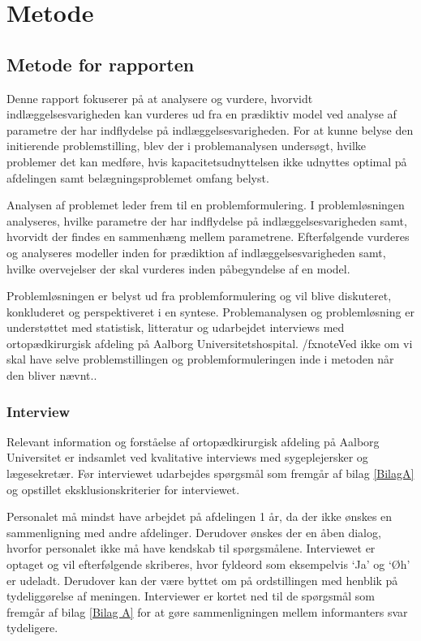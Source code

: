 \chapter*{Metode}
\section*{Metode for rapporten}
Denne rapport fokuserer på at analysere og vurdere, hvorvidt indlæggelsesvarigheden kan vurderes ud fra en prædiktiv model ved analyse af parametre der har indflydelse på indlæggelsesvarigheden. For at kunne belyse den initierende problemstilling, blev der i problemanalysen undersøgt, hvilke problemer det kan medføre, hvis kapacitetsudnyttelsen ikke udnyttes optimal på afdelingen samt belægningsproblemet omfang belyst.


Analysen af problemet leder frem til en problemformulering. I problemløsningen analyseres, hvilke parametre der har indflydelse på indlæggelsesvarigheden samt, hvorvidt der findes en sammenhæng mellem parametrene. Efterfølgende vurderes og analyseres modeller inden for prædiktion af indlæggelsesvarigheden samt, hvilke overvejelser der skal vurderes inden påbegyndelse af en model. 


Problemløsningen er belyst ud fra problemformulering og vil blive diskuteret, konkluderet og perspektiveret i en syntese. Problemanalysen og problemløsning er understøttet med statistisk, litteratur og udarbejdet interviews med ortopædkirurgisk afdeling på Aalborg Universitetshospital.  /fxnote{Ved ikke om vi skal have selve problemstillingen og problemformuleringen inde i metoden når den bliver nævnt.}. 


\subsection*{Interview}
Relevant information og forståelse af ortopædkirurgisk afdeling på Aalborg Universitet er indsamlet ved kvalitative interviews med sygeplejersker og lægesekretær. Før interviewet udarbejdes spørgsmål som fremgår af bilag \ref{BilagA} og opstillet eksklusionskriterier for interviewet. 


Personalet må mindst have arbejdet på afdelingen 1 år, da der ikke ønskes en sammenligning med andre afdelinger. Derudover ønskes der en åben dialog, hvorfor personalet ikke må have kendskab til spørgsmålene. Interviewet er optaget og  vil efterfølgende skriberes, hvor fyldeord som eksempelvis ‘Ja’ og ‘Øh’ er udeladt. Derudover kan der være byttet om på ordstillingen med henblik på tydeliggørelse af meningen. Interviewer er kortet ned til de spørgsmål som fremgår af bilag \ref{Bilag A} for at gøre sammenligningen mellem informanters svar tydeligere. 


